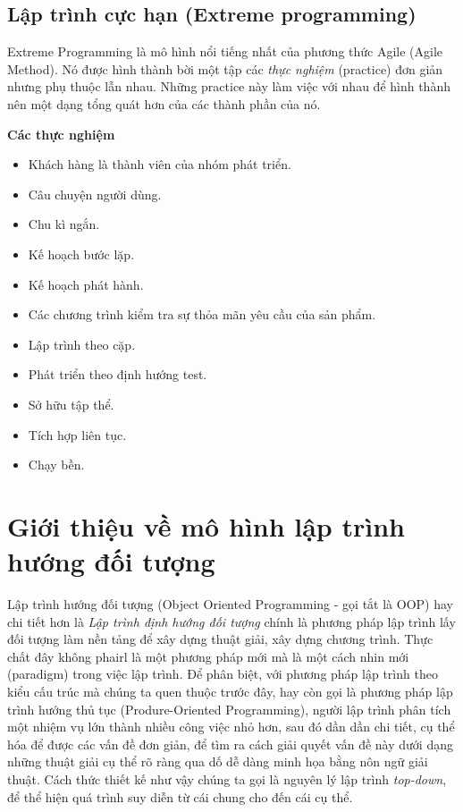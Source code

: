 \documentclass[10pt, a4paper]{article}
\begin{document}
\subsection{Lập trình cực hạn (Extreme programming)}

Extreme Programming là mô hình nổi tiếng nhất của phương thức Agile (Agile Method). Nó được hình thành bời một tập các \emph{thực nghiệm} (practice) đơn giản nhưng phụ thuộc lẫn nhau. Những practice này làm việc với nhau để hình thành nên một dạng tổng quát hơn của các thành phần của nó.

\textbf{Các thực nghiệm}
\begin{itemize}
\item Khách hàng là thành viên của nhóm phát triển.
\item Câu chuyện người dùng.
\item Chu kì ngắn.
\item Kế hoạch bước lặp.
\item Kế hoạch phát hành.
\item Các chương trình kiểm tra sự thỏa mãn yêu cầu của sản phẩm.
\item Lập trình theo cặp.
\item Phát triển theo định hướng test.
\item Sở hữu tập thể.
\item Tích hợp liên tục.
\item Chạy bền.
\end{itemize}

\section{Giới thiệu về mô hình lập trình hướng đối tượng}

Lập trình hướng đối tượng (Object Oriented Programming - gọi tắt là OOP) hay chi tiết hơn là \emph{Lập trình định hướng đối tượng} chính là phương pháp lập trình lấy đối tượng làm nền tảng để xây dựng thuật giải, xây dựng chương trình. Thực chất đây không phairl là một phương pháp mới mà là một cách nhin mới (paradigm) trong việc lập trình. Để phân biệt, với phương pháp lập trình theo kiểu cấu trúc mà chúng ta quen thuộc trước đây, hay còn gọi là phương pháp lập trình hướng thủ tục (Produre-Oriented Programming), người lập trình phân tích một nhiệm vụ lớn thành nhiều công việc nhỏ hơn, sau đó dần dần chi tiết, cụ thể hóa để được các vấn đề đơn giản, để tìm ra cách giải quyết vấn đề này dưới dạng những thuật giải cụ thể rõ ràng qua dố dễ dàng minh họa bằng nôn ngữ giải thuật. Cách thức thiết kế như vậy chúng ta gọi là nguyên lý lập trình \emph{top-down}, để thể hiện quá trình suy diễn từ cái chung cho đến cái cụ thể.
\end{document}
